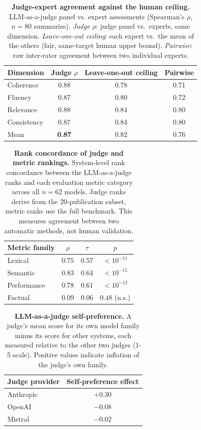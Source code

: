 \begin{table}[H]
\centering
\caption{\textbf{Judge-expert agreement against the human ceiling.} LLM-as-a-judge panel vs. expert assessments (Spearman's $\rho$, $n=80$ summaries). \emph{Judge $\rho$}: judge panel vs.\ experts, same dimension. \emph{Leave-one-out ceiling}: each expert vs.\ the mean of the others (fair, same-target human upper bound). \emph{Pairwise}: raw inter-rater agreement between two individual experts.}\label{tab:judge-expert}
\begin{tabular}{lccc}
\toprule
Dimension & Judge $\rho$ & Leave-one-out ceiling & Pairwise \\
\midrule
Coherence   & 0.88 & 0.78 & 0.71 \\
Fluency     & 0.87 & 0.80 & 0.72 \\
Relevance   & 0.88 & 0.84 & 0.80 \\
Consistency & 0.87 & 0.84 & 0.80 \\
\midrule
Mean        & \textbf{0.87} & 0.82 & 0.76 \\
\bottomrule
\end{tabular}
\end{table}

\begin{table}[H]
\centering
\caption{\textbf{Rank concordance of judge and metric rankings.} System-level rank concordance between the LLM-as-a-judge ranks and each evaluation metric category across all $n=62$ models. Judge ranks derive from the 20-publication subset, metric ranks use the full benchmark. This measures agreement between two automatic methods, not human validation.}\label{tab:concordance}
\begin{tabular}{lccc}
\toprule
Metric family & $\rho$ & $\tau$ & $p$ \\
\midrule
Lexical     & 0.75 & 0.57 & $<10^{-11}$ \\
Semantic    & 0.83 & 0.64 & $<10^{-15}$ \\
Performance & 0.78 & 0.61 & $<10^{-12}$ \\
Factual     & 0.09 & 0.06 & $0.48$ (n.s.) \\
\bottomrule
\end{tabular}
\end{table}

\begin{table}[H]
\centering
\caption{\textbf{LLM-as-a-judge self-preference.} A judge's mean score for its own model family minus its score for other systems, each measured relative to the other two judges (1-5 scale). Positive values indicate inflation of the judge's own family.}\label{tab:selfpref}
\begin{tabular}{lc}
\toprule
Judge provider & Self-preference effect \\
\midrule
Anthropic & $+0.30$ \\
OpenAI    & $-0.08$ \\
Mistral   & $-0.02$ \\
\bottomrule
\end{tabular}
\end{table}

